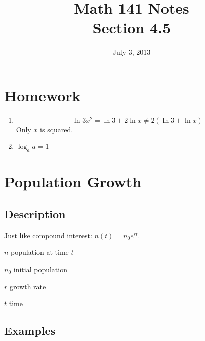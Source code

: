 \documentclass{exam}
\title{Math 141 Notes \\ Section 4.5}
\date{July 3, 2013}
\begin{document}
  \maketitle
  \tableofcontents

  \section{Homework}
  \begin{enumerate}
    \item
      \[
        \ln 3x^2 = \ln 3 + 2 \ln x \neq 2 \left( \ln 3 + \ln x \right)
      \]
      Only $x$ is squared.

    \item $\log_a a = 1$

  \end{enumerate}

  \section{Population Growth}

  \subsection{Description}
  Just like compound interest: $n(t) = n_0 e^{rt}$.

  \begin{itemize*}
    \item $n$ population at time $t$
    \item $n_0$ initial population
    \item $r$ growth rate
    \item $t$ time
  \end{itemize*}

  \subsection{Examples}
\end{document}
